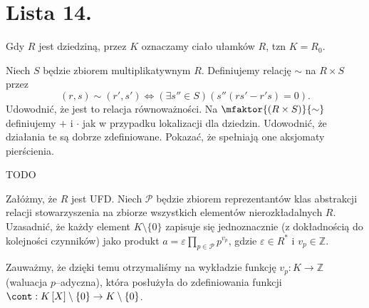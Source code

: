\chapter{Lista 14.}

\begin{context}
	Gdy $R$ jest dziedziną, przez $K$ oznaczamy ciało ułamków $R$, tzn $K = R_0.$
\end{context}
\begin{problem}[1]
	Niech $S$ będzie zbiorem multiplikatywnym $R$. Definiujemy relację $\sim  $ na $R\times S$ przez 
	\[
		\left( r,s \right) \sim \left( r',s' \right) \iff \left(\exists s'' \in S \right) \left(s''\left( rs' -r's \right) = 0\right)   
	.\] 
	Udowodnić, że jest to relacja równoważności. Na $\mfaktor{\left( R\times S \right) }{\sim  } $ definiujemy $\plus$ i  $\cdot $ jak w przypadku lokalizacji dla dziedzin. Udowodnić, że działania te są dobrze zdefiniowane. Pokazać, że spełniają one aksjomaty pierścienia.
\end{problem} 
\begin{solution}
	TODO
\end{solution} 
\begin{problem}[2]
	Załóżmy, że $R$ jest UFD. Niech $\mathcal{P}$ będzie zbiorem reprezentantów klas abstrakcji relacji stowarzyszenia na zbiorze wszystkich elementów nierozkładalnych $R$. Uzasadnić, że każdy element $K\setminus \{0\} $ zapisuje się jednoznacznie (z dokładnością do kolejności czynników) jako produkt $a = \varepsilon \prod_{p \in \mathcal{P}} p^{v_{p}}$, gdzie $\varepsilon \in R^{\ast} $ i $v_{p}\in \mathbb{Z}$.

	Zauważmy, że dzięki temu otrzymaliśmy na wykładzie funkcję $v_{p}: K \to \mathbb{Z}$ (waluacja $p$--adyczna), która posłużyła do zdefiniowania funkcji $\cont : K\left[ X \right] \setminus \{0\} \to K \setminus \{0\}  $.
\end{problem} 

